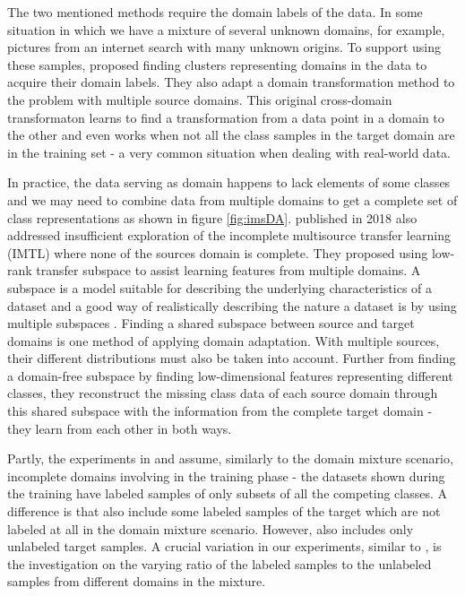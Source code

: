 The two mentioned methods require the domain labels of the data. In some situation in which we have a mixture of several unknown domains, for example, pictures from an internet search with many unknown origins. To support using these samples, \cite{multiDAcluster} proposed finding clusters representing domains in the data to acquire their domain labels. They also adapt a domain transformation method to the problem with multiple source domains. This original cross-domain transformaton \cite{multiDAcrosstrans} learns to find a transformation from a data point in a domain to the other and even works when not all the class samples in the target domain are in the training set - a very common situation when dealing with real-world data. 
 
In practice, the data serving as domain happens to lack elements of some classes and we may need to combine data from multiple domains to get a complete set of class representations as shown in figure \ref{fig:imsDA}. \cite{multisourceDA} published in 2018 also addressed insufficient exploration of the incomplete multisource transfer learning (IMTL) where none of the sources domain is complete. They proposed using low-rank transfer subspace to assist learning features from multiple domains. A subspace is a model suitable for describing the underlying characteristics of a dataset and a good way of realistically describing the nature a dataset is by using multiple subspaces \cite{subspaces}. Finding a shared subspace between source and target domains is one method of applying domain adaptation. With multiple sources, their different distributions must also be taken into account. Further from finding a domain-free subspace by finding low-dimensional features representing different classes, they reconstruct the missing class data of each source domain through this shared subspace with the information from the complete target domain - they learn from each other in both ways. 

Partly, the experiments in \cite{multiDAcrosstrans} and \cite{multisourceDA} assume, similarly to the domain mixture scenario, incomplete domains involving in the training phase - the datasets shown during the training have labeled samples of only subsets of all the competing classes. A difference is that \cite{multiDAcrosstrans} also include some labeled samples of the target which are not labeled at all in the domain mixture scenario. However, \cite{multisourceDA} also includes only unlabeled target samples. A crucial variation in our experiments, similar to \cite{domainMixture}, is the investigation on the varying ratio of the labeled samples to the unlabeled samples from different domains in the mixture. 

